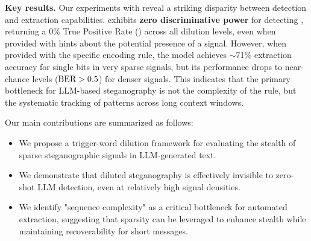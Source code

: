 {\bf Key results.}
Our experiments with \gpt reveal a striking disparity between detection and extraction capabilities. \gpt exhibits {\bf zero discriminative power} for detecting \stego, returning a 0\% True Positive Rate (\TPR) across all dilution levels, even when provided with hints about the potential presence of a signal. However, when provided with the specific encoding rule, the model achieves $\sim$71\% extraction accuracy for single bits in very sparse signals, but its performance drops to near-chance levels ($\text{BER} > 0.5$) for denser signals. This indicates that the primary bottleneck for LLM-based steganography is not the complexity of the rule, but the systematic tracking of patterns across long context windows.

Our main contributions are summarized as follows:
\begin{itemize}[leftmargin=*,itemsep=0pt,topsep=0pt]
    \item We propose a trigger-word dilution framework for evaluating the stealth of sparse steganographic signals in LLM-generated text.
    \item We demonstrate that diluted steganography is effectively invisible to zero-shot LLM detection, even at relatively high signal densities.
    \item We identify "sequence complexity" as a critical bottleneck for automated extraction, suggesting that sparsity can be leveraged to enhance stealth while maintaining recoverability for short messages.
\end{itemize}
